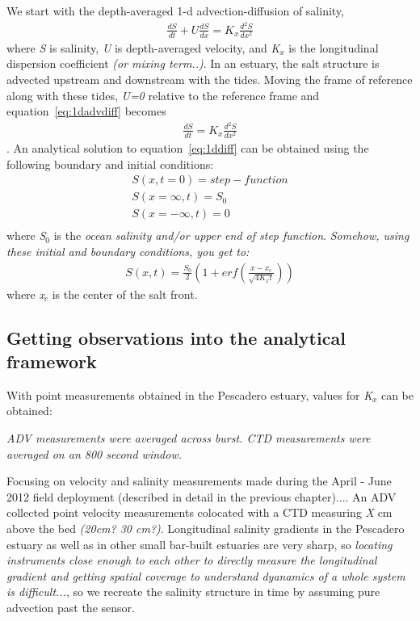 We start with the depth-averaged 1-d advection-diffusion of salinity,
\begin{eqnarray}
\frac{dS}{dt} + U\frac{dS}{dx} = K_x\frac{d^2S}{dx^2} \label{eq:1dadvdiff}
\end{eqnarray}
where \emph{S} is salinity, \emph{U} is depth-averaged velocity, and \emph{K$_x$} is the longitudinal dispersion coefficient \emph{(or mixing term..)}. In an estuary, the salt structure is advected upstream and downstream with the tides. Moving the frame of reference along with these tides, \emph{U=0} relative to the reference frame and equation~\ref{eq:1dadvdiff} becomes
\begin{eqnarray}
\frac{dS}{dt} = K_x\frac{d^2S}{dx^2} \label{eq:1ddiff}
\end{eqnarray}
. An analytical solution to equation~\ref{eq:1ddiff} can be obtained using the following boundary and initial conditions:
\begin{eqnarray}
S(x,t=0) = step-function\label{eq:1ddiffIC}\\
S(x=\infty,t) = S_0\label{eq:1ddiffBC1}\\
S(x=-\infty,t) = 0\label{eq:1ddiffBC2}\\
\end{eqnarray}
where \emph{S$_0$} is the \emph{ocean salinity and/or upper end of step function}. \emph{Somehow, using these initial and boundary conditions, you get to:}
\begin{eqnarray}
S(x,t) = \frac{S_0}{2}\left(1+erf\left(\frac{x-x_c}{\sqrt{4K_xt}}\right)\right) \label{eq:S}
\end{eqnarray}
where \emph{x$_c$} is the center of the salt front. 


\subsection{Getting observations into the analytical framework} \label{ssec:ObsInto1DAdvDiff}


With point measurements obtained in the Pescadero estuary, values for \emph{K$_x$} can be obtained: 

\emph{ADV measurements were averaged across burst. CTD measurements were averaged on an 800 second window.}

Focusing on velocity and salinity measurements made during the April - June 2012 field deployment (described in detail in the previous chapter).... An ADV collected point velocity measurements colocated with a CTD measuring \emph{X} cm above the bed \emph{(20cm? 30 cm?)}. Longitudinal salinity gradients in the Pescadero estuary as well as in other small bar-built estuaries are very sharp, so \emph{locating instruments close enough to each other to directly measure the longitudinal gradient and getting spatial coverage to understand dyanamics of a whole system is difficult...}, so we recreate the salinity structure in time by assuming pure advection past the sensor. 

